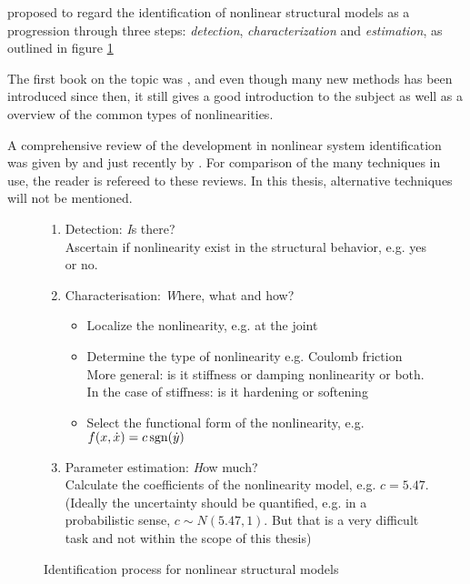 \textcite{kerschen2006a} proposed to regard the identification of nonlinear
structural models as a progression through three steps: \textit{detection},
\textit{characterization} and \textit{estimation}, as outlined in figure
\ref{fig:ident_process}

The first book on the topic was \autocite{worden2000nonlinearity}, and even
though many new methods has been introduced since then, it still gives a good
introduction to the subject as well as a overview of the common types of
nonlinearities.

A comprehensive review of the development in nonlinear system identification was
given by \autocite{kerschen2006a} and just recently by \autocite{noel2016a}. For
comparison of the many techniques in use, the reader is refereed to these
reviews. In this thesis, alternative techniques will not be mentioned.


\begin{figure}[ht!]
  \centering
  \begin{mdframed}
    \begin{enumerate}
    \item Detection: {\textit Is there?}\\
      Ascertain if nonlinearity exist in the structural behavior, e.g. yes or
      no.
    \item Characterisation: {\textit Where, what and how?}
      \begin{itemize}
      \item Localize the nonlinearity, e.g. at the joint
      \item Determine the type of nonlinearity e.g.  Coulomb friction\\
        More general: is it stiffness or damping nonlinearity or both. In the
        case of stiffness: is it hardening or softening
      \item Select the functional form of the nonlinearity, e.g.
        $f(x,\dot x) = c \operatorname{sgn} (\dot y)$
      \end{itemize}
    \item Parameter estimation: {\textit How much?}\\
      Calculate the coefficients of the nonlinearity model, e.g. $c = 5.47$.\\
      (Ideally the uncertainty should be quantified, e.g. in a probabilistic
      sense, $c \sim N(5.47,1)$. But that is a very difficult task and not
      within the scope of this thesis)
    \end{enumerate}
  \end{mdframed}
  \caption{Identification process for nonlinear structural models}
  \label{fig:ident_process}
\end{figure}

